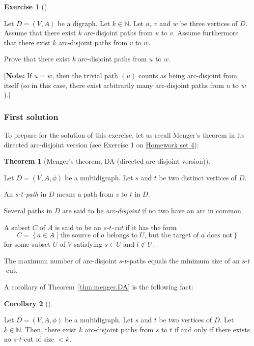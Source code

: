 \documentclass[numbers=enddot,12pt,final,onecolumn,notitlepage]{scrartcl}%
\newcounter{exer}
\theoremstyle{definition}
\newtheorem{theo}{Theorem}[section]
\newenvironment{theorem}[1][]
{\begin{theo}[#1]\begin{leftbar}}
{\end{leftbar}\end{theo}}
\newtheorem{coro}[theo]{Corollary}
\newenvironment{corollary}[1][]
{\begin{coro}[#1]\begin{leftbar}}
{\end{leftbar}\end{coro}}
\newtheorem{exmp}[exer]{Exercise}
\newenvironment{exercise}[1][]
{\begin{exmp}[#1]\begin{leftbar}}
{\end{leftbar}\end{exmp}}
\newcommand{\NN}{\mathbb{N}}
\newcommand{\set}[1]{\left\{ #1 \right\}}
\newcommand{\tup}[1]{\left( #1 \right)}
\begin{document}
\begin{exercise} \label{exe.mt2.menger-postnikov}
Let $D = \tup{V, A}$ be a digraph.
Let $k \in \NN$.
Let $u$, $v$ and $w$ be three vertices of $D$.
Assume that there exist $k$ arc-disjoint paths from $u$ to $v$.
Assume furthermore that there exist $k$ arc-disjoint paths from $v$
to $w$.

Prove that there exist $k$ arc-disjoint paths from $u$ to $w$.

[\textbf{Note:} If $u = w$, then the trivial path $\tup{u}$ counts as
being arc-disjoint from itself (so in this case, there exist
arbitrarily many arc-disjoint paths from $u$ to $w$).]
\end{exercise}

\subsubsection{First solution}

To prepare for the solution of this exercise, let us recall
Menger's theorem in its directed arc-disjoint version
(see Exercise 1 on
\href{http://www.cip.ifi.lmu.de/~grinberg/t/17s/hw4.pdf}{Homework set 4}):

\begin{theorem}[Menger's theorem, DA (directed arc-disjoint
version)] \label{thm.menger.DA}
Let $D = \tup{V, A, \phi}$ be a multidigraph.
Let $s$ and $t$ be two distinct vertices of $D$.

An \textit{$s$-$t$-path} in $D$ means a path from $s$ to $t$ in $D$.

Several paths in $D$ are said to be
\textit{arc-disjoint} if no two have an arc in common.

A subset $C$ of $A$ is said to be an \textit{$s$-$t$-cut} if it has
the form
\[
C = \set{ a \in A \mid \text{the source of } a \text{ belongs to } U
                        \text{, but the target of } a \text{ does not}
        }
\]
for some subset $U$ of $V$ satisfying $s \in U$ and $t \notin U$.

The maximum number of arc-disjoint $s$-$t$-paths equals
the minimum size of an $s$-$t$-cut.
\end{theorem}

A corollary of Theorem~\ref{thm.menger.DA} is the following fact:

\begin{corollary} \label{cor.menger.DA.1}
Let $D = \tup{V, A, \phi}$ be a multidigraph.
Let $s$ and $t$ be two vertices of $D$.
Let $k \in \NN$.
Then, there exist $k$ arc-disjoint paths from $s$ to $t$ if and only
if there exists no $s$-$t$-cut of size $< k$.
\end{corollary}
\end{document}
